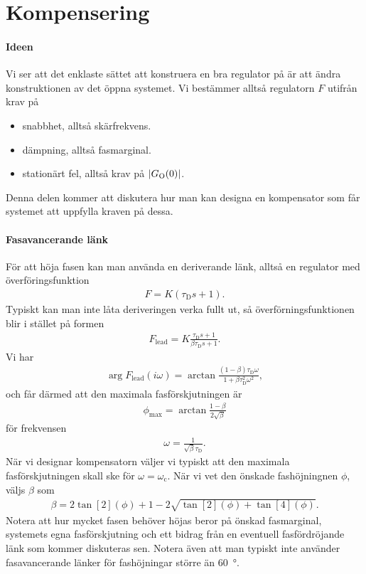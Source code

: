 \section{Kompensering}

\paragraph{Ideen}
Vi ser att det enklaste sättet att konstruera en bra regulator på är att ändra konstruktionen av det öppna systemet. Vi bestämmer alltså regulatorn $F$ utifrån krav på
\begin{itemize}
	\item snabbhet, alltså skärfrekvens.
	\item dämpning, alltså fasmarginal.
	\item stationärt fel, alltså krav på $\abs{G_{\text{O}}(0)}$.
\end{itemize}
Denna delen kommer att diskutera hur man kan designa en kompensator som får systemet att uppfylla kraven på dessa.

\paragraph{Fasavancerande länk}
För att höja fasen kan man använda en deriverande länk, alltså en regulator med överföringsfunktion
\begin{align*}
	F = K(\tau_{\text{D}}s + 1).
\end{align*}
Typiskt kan man inte låta deriveringen verka fullt ut, så överförningsfunktionen blir i stället på formen
\begin{align*}
	F_{\text{lead}} = K\frac{\tau_{\text{D}}s + 1}{\beta\tau_{\text{D}}s + 1}.
\end{align*}
Vi har
\begin{align*}
	\arg{F_{\text{lead}}(i\omega)} = \arctan{\frac{(1 - \beta)\tau_{\text{D}}\omega}{1 + \beta\tau_{\text{D}}^{2}\omega^{2}}},
\end{align*}
och får därmed att den maximala fasförskjutningen är
\begin{align*}
	\phi_{\text{max}} = \arctan{\frac{1 - \beta}{2\sqrt{\beta}}}
\end{align*}
för frekvensen
\begin{align*}
	\omega = \frac{1}{\sqrt{\beta}\tau_{\text{D}}}.
\end{align*}
När vi designar kompensatorn väljer vi typiskt att den maximala fasförskjutningen skall ske för $\omega = \omega_{\text{c}}$. När vi vet den önskade fashöjningnen $\phi$, väljs $\beta$ som
\begin{align*}
	\beta = 2\tan[2](\phi) + 1 - 2\sqrt{\tan[2](\phi) + \tan[4](\phi)}.
\end{align*}
Notera att hur mycket fasen behöver höjas beror på önskad fasmarginal, systemets egna fasförskjutning och ett bidrag från en eventuell fasfördröjande länk som kommer diskuteras sen. Notera även att man typiskt inte använder fasavancerande länker för fashöjningar större än \SI{60}{\degree}.

